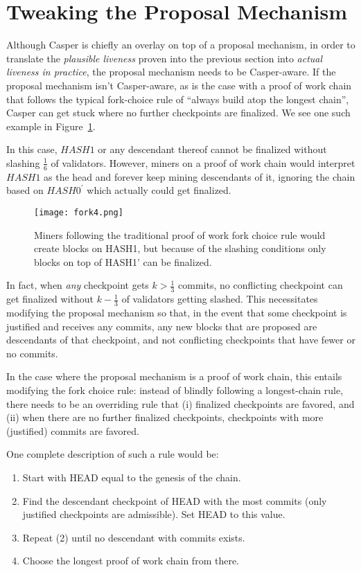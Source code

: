\documentclass[12pt, final]{article}
\newcommand{\figref}[1]{Figure~\ref{#1}}
\begin{document}
\section{Tweaking the Proposal Mechanism}
\label{sect:forkchoice}

Although Casper is chiefly an overlay on top of a proposal mechanism, in order to translate the \textit{plausible liveness} proven into the previous section into \textit{actual liveness in practice}, the proposal mechanism needs to be Casper-aware.  If the proposal mechanism isn't Casper-aware, as is the case with a proof of work chain that follows the typical fork-choice rule of ``always build atop the longest chain'', Casper can get stuck where no further checkpoints are finalized.  We see one such example in \figref{fig:forkchoice}.

In this case, $HASH1$ or any descendant thereof cannot be finalized without slashing $\frac{1}{6}$ of validators. However, miners on a proof of work chain would interpret $HASH1$ as the head and forever keep mining descendants of it, ignoring the chain based on $HASH0^\prime$ which actually could get finalized.

\begin{figure}[h!tb]
\centering
\texttt{[image: fork4.png]}
\caption{Miners following the traditional proof of work fork choice rule would create blocks on HASH1, but because of the slashing conditions only blocks on top of HASH1' can be finalized.}
\label{fig:forkchoice}
\end{figure}

In fact, when \textit{any} checkpoint gets $k > \frac{1}{3}$ commits, no conflicting checkpoint can get finalized without $k - \frac{1}{3}$ of validators getting slashed. This necessitates modifying the proposal mechanism so that, in the event that some checkpoint is justified and receives any commits, any new blocks that are proposed are descendants of that checkpoint, and not conflicting checkpoints that have fewer or no commits.

In the case where the proposal mechanism is a proof of work chain, this entails modifying the fork choice rule: instead of blindly following a longest-chain rule, there needs to be an overriding rule that (i) finalized checkpoints are favored, and (ii) when there are no further finalized checkpoints, checkpoints with more (justified) commits are favored.

One complete description of such a rule would be:

\begin{enumerate}
\item Start with HEAD equal to the genesis of the chain.
\item Find the descendant checkpoint of HEAD with the most commits (only justified checkpoints are admissible). Set HEAD to this value.
\item Repeat (2) until no descendant with commits exists.
\item Choose the longest proof of work chain from there.
\end{enumerate}
\end{document}
